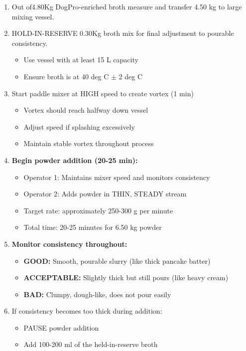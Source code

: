\vspace{0.5em}

\begin{enumerate}[leftmargin=1.5em]
\item Out  of4.80Kg DogPro-enriched broth measure and transfer 4.50 kg to large mixing vessel. 
\item HOLD-IN-RESERVE 0.30Kg broth mix for final adjustment to pourable consistency. 
  \begin{itemize}
  \item Use vessel with at least 15 L capacity
  \item Ensure broth is at 40 deg C $\pm$ 2 deg C
  \end{itemize}
\item Start paddle mixer at HIGH speed to create vortex (1 min)
  \begin{itemize}
  \item Vortex should reach halfway down vessel
  \item Adjust speed if splashing excessively
  \item Maintain stable vortex throughout process
  \end{itemize}
\item \textbf{Begin powder addition (20-25 min):}
  \begin{itemize}
  \item Operator 1: Maintains mixer speed and monitors consistency
  \item Operator 2: Adds powder in THIN, STEADY stream
  \item Target rate: approximately 250-300 g per minute
  \item Total time: 20-25 minutes for 6.50 kg powder
  \end{itemize}
\item \textbf{Monitor consistency throughout:}
  \begin{itemize}
  \item \textbf{GOOD:} Smooth, pourable slurry (like thick pancake batter)
  \item \textbf{ACCEPTABLE:} Slightly thick but still pours (like heavy cream)
  \item \textbf{BAD:} Clumpy, dough-like, does not pour easily
  \end{itemize}
\item If consistency becomes too thick during addition:
  \begin{itemize}
  \item PAUSE powder addition
  \item Add 100-200 ml of the held-in-reserve broth 

\end{itemize}
\end{enumerate}
